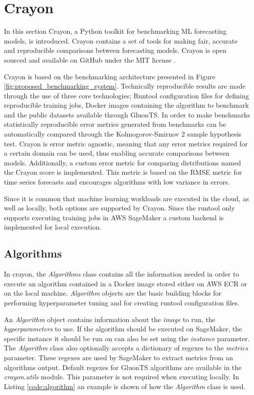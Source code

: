 \chapter{Crayon}
\label{cha:crayon}

In this section Crayon, a Python toolkit for benchmarking ML forecasting models, is introduced. Crayon contains a set of tools for making fair, accurate and reproducible comparisons between forecasting models. Crayon is open sourced and available on GitHub under the MIT license \cite{crayon_github}.

Crayon is based on the benchmarking architecture presented in Figure \ref{fig:proposed_benchmarking_system}. Technically reproducible results are made through the use of three core technologies; Runtool configuration files for defining reproducible training jobs, Docker images containing the algorithm to benchmark and the public datasets available through GluonTS. In order to make benchmarks statistically reproducible error metrics generated from benchmarks can be automatically compared through the Kolmogorov-Smirnov 2 sample hypothesis test. Crayon is error metric agnostic, meaning that any error metrics required for a certain domain can be used, thus enabling accurate comparisons between models. Additionally, a custom error metric for comparing distributions named the Crayon score is implemented. This metric is based on the RMSE metric for time series forecasts and encourages algorithms with low variance in errors.

Since it is common that machine learning workloads are executed in the cloud, as well as locally, both options are supported by Crayon. Since the runtool only supports executing training jobs in AWS SageMaker a custom backend is implemented for local execution.

\section{Algorithms}
\label{crayon:algorithms}
In crayon, the \textit{Algorithms} class contains all the information needed in order to execute an algorithm contained in a Docker image stored either on AWS ECR or on the local machine. \textit{Algorithm} objects are the basic building blocks for performing hyperparameter tuning and for creating runtool configuration files.

An \textit{Algorithm} object contains information about the \textit{image} to run, the \textit{hyperparameters} to use. If the algorithm should be executed on SageMaker, the specific instance it should be run on can also be set using the \textit{instance} parameter. The \textit{Algorithm} class also optionally accepts a dictionary of regexes to the \textit{metrics} parameter. These regexes are used by SageMaker to extract metrics from an algorithms output. Default regexes for GluonTS algorithms are available in the \textit{crayon.utils} module. This parameter is not required when executing locally. In Listing \ref{code:algorithm} an example is shown of how the \textit{Algorithm} class is used.

